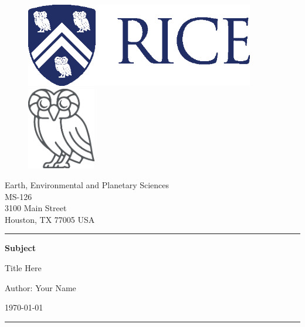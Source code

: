 
\begin{titlepage}

\begin{figure}[htbp]
    \centering
    \includegraphics[width=10cm]{figures/Rice_Logo_280_Blue.eps}
    \hfill
    \includegraphics[width=3cm]{figures/Rice_Owl_Flat_425_Gray.eps}
\end{figure}


\vspace{-0.5cm}
\begin{flushright}
    {\small Earth, Environmental and Planetary Sciences}\\
    {\small MS-126}\\
    {\small 3100 Main Street}\\
    {\small Houston, TX 77005 USA}
\end{flushright}
\hrule
\vspace{1cm}


{\LARGE\noindent \textbf{Subject} \par}
\vspace{0.3cm}
{\Large\noindent Title Here \par}
\vspace{2cm}
{\LARGE\noindent Author: Your Name \par}
\vspace{0.5cm}
{\Large\noindent \today \par}
\vspace{7cm}
\hrule



\end{titlepage}

